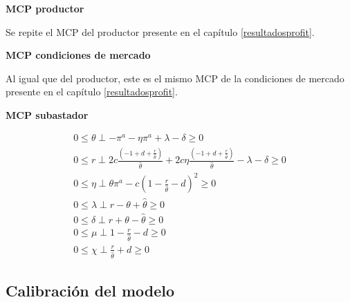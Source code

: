 \textbf{MCP productor}

Se repite el MCP del productor presente en el capítulo \ref{resultadosprofit}.

\textbf{MCP condiciones de mercado}

Al igual que del productor, este es el mismo MCP de la condiciones de mercado presente en el capítulo \ref{resultadosprofit}.

\textbf{MCP subastador}

\begin{footnotesize}
\begin{align}
    0 \leq \theta \perp -\pi^a   - \eta\pi^a  + \lambda -  \delta \geq 0\\
   0 \leq r \perp 2c\frac{(-1+d+\frac{r}{\hat{\theta}})}{\hat{\theta}} + 2c\eta \frac{(-1+d+\frac{r}{\hat{\theta}})}{\hat{\theta}} - \lambda - \delta  \geq 0\\
0 \leq \eta \perp \theta \pi^a - c(1-\frac{r}{\hat{\theta}}-d)^2 \geq 0 \\
0 \leq \lambda \perp r - \theta + \hat{\theta} \geq 0 \\
0 \leq \delta \perp r + \theta - \hat{\theta} \geq 0\\
0 \leq \mu \perp 1-\frac{r}{\hat{\theta}}-d \geq 0\\
0 \leq\chi \perp \frac{r}{\hat{\theta}} + d \geq 0 
\end{align}
\end{footnotesize}

\subsection{Calibración del modelo}

